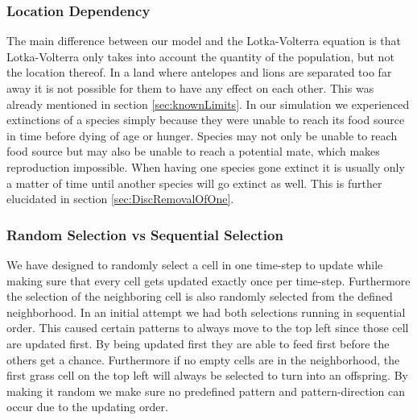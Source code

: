 \documentclass[11pt]{article}
\begin{document}
\subsubsection{Location Dependency}
\label{sec:DiscLocationDep}
The main difference between our model and the Lotka-Volterra equation is that Lotka-Volterra only takes into account the quantity of the population, but not the location thereof. In a land where antelopes and lions are separated too far away it is not possible for them to have any effect on each other. This was already mentioned in section \ref{sec:knownLimits}. In our simulation we experienced extinctions of a species simply because they were unable to reach its food source in time before dying of age or hunger. Species may not only be unable to reach food source but may also be unable to reach a potential mate, which makes reproduction impossible. When having one species gone extinct it is usually only a matter of time until another species will go extinct as well. This is further elucidated in section \ref{sec:DiscRemovalOfOne}.

\subsubsection{Random Selection vs Sequential Selection}
We have designed to randomly select a cell in one time-step to update while making sure that every cell gets updated exactly once per time-step. Furthermore the selection of the neighboring cell is also randomly selected from the defined neighborhood. In an initial attempt we had both selections running in sequential order. This caused certain patterns to always move to the top left since those cell are updated first. By being updated first they are able to feed first before the others get a chance. Furthermore if no empty cells are in the neighborhood, the first grass cell on the top left will always be selected to turn into an offspring. By making it random we make sure no predefined pattern and pattern-direction can occur due to the updating order.
\end{document}
